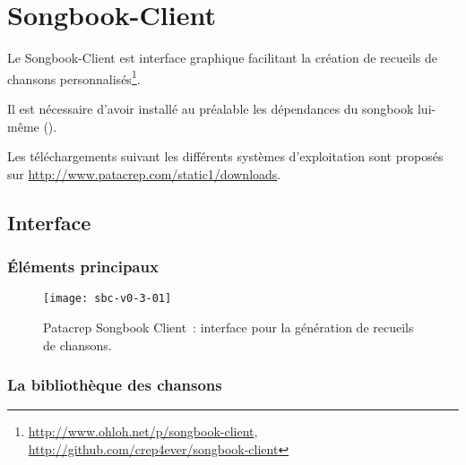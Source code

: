 \chapter{Songbook-Client}
\setcounter{chapter}{2}
\label{chap:songbook-client}
\minitoc
\newpage

Le Songbook-Client est interface graphique facilitant la création de
recueils de chansons
personnalisés\footnote{\url{http://www.ohloh.net/p/songbook-client},
  \url{http://github.com/crep4ever/songbook-client}}.

Il est nécessaire d'avoir installé au préalable les dépendances du
songbook lui-même (). 

Les téléchargements suivant les différents systèmes d'exploitation
sont proposés sur \url{http://www.patacrep.com/static1/downloads}.


\section{Interface}

\subsection{Éléments principaux}

\begin{figure}
  \centering
  \texttt{[image: sbc-v0-3-01]}
  \caption{Patacrep Songbook Client~: interface pour la génération de
    recueils de chansons.}
  \label{fig:sb-client}
\end{figure}


\subsection{La bibliothèque des chansons}



